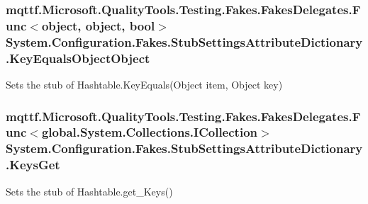 \hypertarget{class_system_1_1_configuration_1_1_fakes_1_1_stub_settings_attribute_dictionary_af0339dc7fa0ffc87851718afcca750a7}{
\subsubsection[{Key\-Equals\-Object\-Object}]{\setlength{\rightskip}{0pt plus 5cm}mqttf.\-Microsoft.\-Quality\-Tools.\-Testing.\-Fakes.\-Fakes\-Delegates.\-Func$<$object, object, bool$>$ System.\-Configuration.\-Fakes.\-Stub\-Settings\-Attribute\-Dictionary.\-Key\-Equals\-Object\-Object}}\label{class_system_1_1_configuration_1_1_fakes_1_1_stub_settings_attribute_dictionary_af0339dc7fa0ffc87851718afcca750a7}


Sets the stub of Hashtable.\-Key\-Equals(\-Object item, Object key)

\hypertarget{class_system_1_1_configuration_1_1_fakes_1_1_stub_settings_attribute_dictionary_a39b5141ae1e247f1da86ef6671b26a60}{
\subsubsection[{Keys\-Get}]{\setlength{\rightskip}{0pt plus 5cm}mqttf.\-Microsoft.\-Quality\-Tools.\-Testing.\-Fakes.\-Fakes\-Delegates.\-Func$<$global.\-System.\-Collections.\-I\-Collection$>$ System.\-Configuration.\-Fakes.\-Stub\-Settings\-Attribute\-Dictionary.\-Keys\-Get}}\label{class_system_1_1_configuration_1_1_fakes_1_1_stub_settings_attribute_dictionary_a39b5141ae1e247f1da86ef6671b26a60}


Sets the stub of Hashtable.\-get\-\_\-\-Keys()

